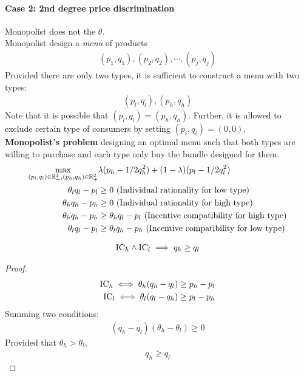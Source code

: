 \documentclass{article}
\begin{document}
   	\paragraph{Case 2: 2nd degree price discrimination} Monopolist does not the $\theta$. \\
   	Monopolist design a \emph{menu} of products
   	\begin{align}
   		(p_1, q_1), (p_2, q_2), \cdots, (p_j, q_j)
   	\end{align}
   	Provided there are only two types, it is sufficient to construct a menu with two types:
   	\begin{align}
   		 (p_l, q_l), (p_h, q_h)
   	\end{align}
   	Note that it is possible that $(p_l, q_l) = (p_h, q_h)$. Further, it is allowed to exclude certain type of consumers by setting $(p_i, q_i) = (0, 0)$. \\
   	\textbf{Monopolist's problem} designing an optimal menu such that both types are willing to purchase and each type only buy the bundle designed for them.
   	\begin{align}
   		\max_{(p_l, q_l) \in \mathbb{R}^2_+, (p_h, q_h) \in \mathbb{R}^2_+} &\lambda (p_h - 1/2 q_h^2) + (1 - \lambda) (p_l - 1/2 q_l^2) \\
   		\theta_l q_l - p_l &\geq 0 \text{{ (Individual rationality for low type)}} \\
   		\theta_h q_h - p_h &\geq 0 \text{{ (Individual rationality for high type)}} \\
   		\theta_h q_h - p_h &\geq \theta_h q_l - p_l \text{{ (Incentive compatibility for high type)}} \\
   		\theta_l q_l - p_l &\geq \theta_l q_h - p_h \text{{ (Incentive compatibility for low type)}}
   	\end{align}
   	\begin{proposition}[Step 0]
   		\begin{align}
   			\text{{IC}}_h \land \text{{IC}}_l \implies q_h \geq q_l
   		\end{align}
   	\end{proposition}
   	
   	\begin{proof}
   		\begin{align}
   			\text{{IC}}_h \iff \theta_h (q_h - q_l) \geq p_h - p_l \\
   			\text{{IC}}_l \iff \theta_l (q_l - q_h) \geq p_l - p_h
   		\end{align}
   		Summing two conditions:
   		\begin{align}
   			(q_h - q_l)(\theta_h - \theta_l) \geq 0
   		\end{align}
   		Provided that $\theta_h > \theta_l$,
   		\begin{align}
   			q_h \geq q_l
   		\end{align}
   	\end{proof}
   	
\end{document}
